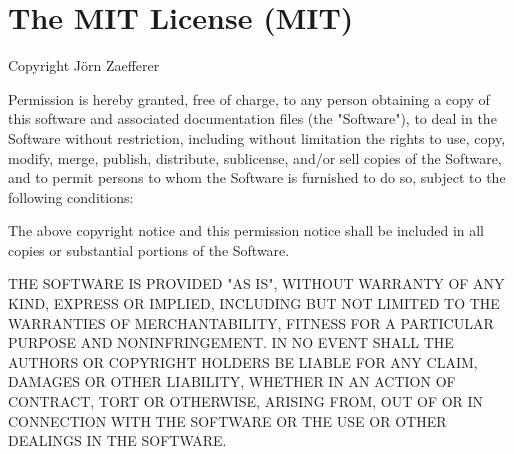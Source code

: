 \chapter{The MIT License (MIT) }
\hypertarget{md__event_master_8_web_2wwwroot_2lib_2jquery-validation_2_l_i_c_e_n_s_e}{}\label{md__event_master_8_web_2wwwroot_2lib_2jquery-validation_2_l_i_c_e_n_s_e}
Copyright Jörn Zaefferer

Permission is hereby granted, free of charge, to any person obtaining a copy of this software and associated documentation files (the "{}\+Software"{}), to deal in the Software without restriction, including without limitation the rights to use, copy, modify, merge, publish, distribute, sublicense, and/or sell copies of the Software, and to permit persons to whom the Software is furnished to do so, subject to the following conditions\+:

The above copyright notice and this permission notice shall be included in all copies or substantial portions of the Software.

THE SOFTWARE IS PROVIDED "{}\+AS IS"{}, WITHOUT WARRANTY OF ANY KIND, EXPRESS OR IMPLIED, INCLUDING BUT NOT LIMITED TO THE WARRANTIES OF MERCHANTABILITY, FITNESS FOR A PARTICULAR PURPOSE AND NONINFRINGEMENT. IN NO EVENT SHALL THE AUTHORS OR COPYRIGHT HOLDERS BE LIABLE FOR ANY CLAIM, DAMAGES OR OTHER LIABILITY, WHETHER IN AN ACTION OF CONTRACT, TORT OR OTHERWISE, ARISING FROM, OUT OF OR IN CONNECTION WITH THE SOFTWARE OR THE USE OR OTHER DEALINGS IN THE SOFTWARE. 